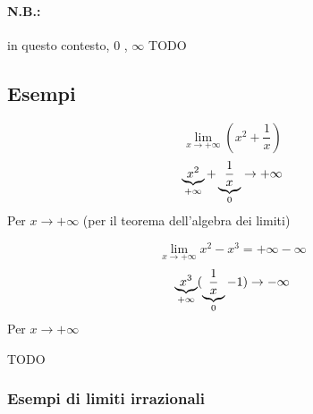 \documentclass[a4paper]{article}
\theoremstyle{break}
\theoremstyle{break}
\theoremstyle{break}
\theoremstyle{break}
\begin{document}
\paragraph{\textbf{N.B.:}} in questo contesto, \( 0 \) , \( \infty \) TODO

\subsection{Esempi}
\begin{example}
	\[ \lim_{x \to +\infty} (x^2+\frac{1}{x})  \]
	\[
		\underbrace{x^2}_\text{\( +\infty \)} + \underbrace{\frac{1}{x}}_\text{\( 0 \)} \to +\infty
	\]
	Per \( x \to +\infty \) (per il teorema dell'algebra dei limiti)
\end{example}
\begin{example}
	\[
		\lim_{x \to +\infty} x^2-x^3 = +\infty - \infty
	\]
	\[
		\underbrace{x^3}_\text{\( +\infty \)}(\underbrace{\frac{1}{x}}_\text{\( 0 \)} - 1) \to -\infty
	\]
	Per \( x \to +\infty \)
\end{example}
\begin{example}
	TODO
\end{example}
\subsubsection{Esempi di limiti irrazionali}
\end{document}

